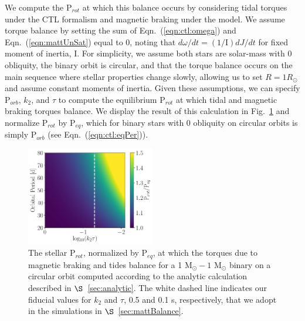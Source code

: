 \documentclass[twocolumn]{aastex61}
\begin{document}
We compute the P$_{rot}$ at which this balance occurs by considering tidal torques under the CTL formalism and magnetic braking under the \citet{Matt2015} model. We assume torque balance by setting the sum of Eqn.~(\ref{eqn:ctl:omega}) and Eqn.~(\ref{eqn:mattUnSat}) equal to 0, noting that $d\omega/dt = (1/\mathrm{I}) dJ/dt$ for fixed moment of inertia, I. For simplicity, we assume both stars are solar-mass with 0 obliquity, the binary orbit is circular, and that the torque balance occurs on the main sequence where stellar properties change slowly, allowing us to set $R = 1 R_{\odot}$ and assume constant moments of inertia. Given these assumptions, we can specify P$_{orb}$, $k_2$, and $\tau$ to compute the equilibrium P$_{rot}$ at which tidal and magnetic braking torques balance. We display the result of this calculation in Fig.~\ref{fig:analyticBalance} and normalize P$_{rot}$ by P$_{eq}$, which for binary stars with 0 obliquity on circular orbits is simply P$_{orb}$ (see Eqn.~(\ref{eqn:ctl:eqPer})).

\begin{figure}[h]
	\includegraphics[width=0.5\textwidth]{../Plots/analyticTorque.pdf}
   \caption{The stellar P$_{rot}$, normalized by P$_{eq}$, at which the torques due to magnetic braking and tides balance for a 1 M$_{\odot} - 1$ M$_{\odot}$ binary on a circular orbit computed according to the analytic calculation described in $\S$~\ref{sec:analytic}. The white dashed line indicates our fiducial values for $k_2$ and $\tau$, 0.5 and 0.1 s, respectively, that we adopt in the simulations in $\S$~\ref{sec:mattBalance}. }%
    \label{fig:analyticBalance}%
\end{figure}
\end{document}
